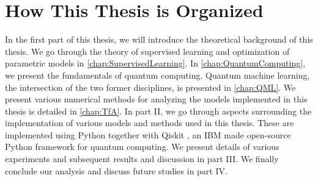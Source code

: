 \section{How This Thesis is Organized}
In the first part of this thesis, we will introduce the theoretical background of this thesis. We go through the theory of supervised learning and optimization of parametric models in \autoref{chap:SupervisedLearning}. In \autoref{chap:QuantumComputing}, we present the fundamentals of quantum computing. Quantum machine learning, the intersection of the two former disciplines, is presented in \autoref{chap:QML}. We present various numerical methods for analyzing the models implemented in this thesis is detailed in \autoref{chap:TfA}. In part II, we go through aspects surrounding the implementation of various models and methods used in this thesis. These are implemented using Python together with Qiskit \cite{Qiskit}, an IBM made open-source Python framework for quantum computing. We present details of various experiments and subsequent results and discussion in part III. We finally conclude our analysis and discuss future studies in part IV.

